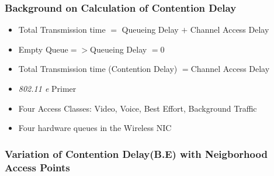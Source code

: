 \documentclass{beamer}
\begin{document}
\begin{frame}
  \frametitle{Background on Calculation of Contention Delay} 
    \begin{itemize} 
    \item Total Transmission time $=$ Queueing Delay $+$ Channel Access Delay 
    \item Empty Queue$ => $Queueing Delay $ =0 $
    \item Total Transmission time (Contention Delay) $=$Channel Access Delay 
    \end{itemize}
    \begin{itemize}
    \item \textit{802.11 e } Primer
    \item Four Access Classes: Video, Voice, Best Effort, Background Traffic
    \item Four hardware queues in the Wireless NIC 
    \end{itemize}
\end{frame}
\begin{frame}
  \frametitle{Variation of Contention Delay(B.E) with Neigborhood Access Points}
\end{frame}
\end{document}
